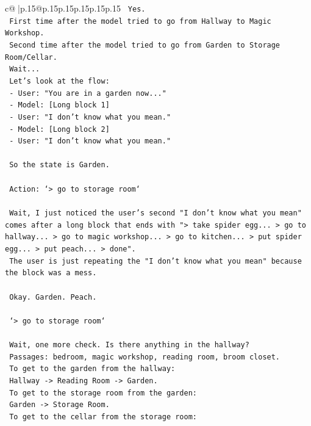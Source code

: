 \documentclass{article}
\begin{document}
{\begin{supertabular}{c@{$\;$}|p{.15\linewidth}@{}p{.15\linewidth}p{.15\linewidth}p{.15\linewidth}p{.15\linewidth}p{.15\linewidth}}
{{{\texttt{    Yes.} \\
\texttt{    First time after the model tried to go from Hallway to Magic Workshop.} \\
\texttt{    Second time after the model tried to go from Garden to Storage Room/Cellar.} \\
\texttt{    Wait...} \\
\texttt{    Let's look at the flow:} \\
\texttt{    {-} User: "You are in a garden now..."} \\
\texttt{    {-} Model: {[}Long block 1{]}} \\
\texttt{    {-} User: "I don't know what you mean."} \\
\texttt{    {-} Model: {[}Long block 2{]}} \\
\texttt{    {-} User: "I don't know what you mean."} \\
\\ 
\texttt{    So the state is Garden.} \\
\\ 
\texttt{    Action: `> go to storage room`} \\
\\ 
\texttt{    Wait, I just noticed the user's second "I don't know what you mean" comes after a long block that ends with "> take spider egg... > go to hallway... > go to magic workshop... > go to kitchen... > put spider egg... > put peach... > done".} \\
\texttt{    The user is just repeating the "I don't know what you mean" because the block was a mess.} \\
\\ 
\texttt{    Okay. Garden. Peach.} \\
\\ 
\texttt{    `> go to storage room`} \\
\\ 
\texttt{    Wait, one more check. Is there anything in the hallway?} \\
\texttt{    Passages: bedroom, magic workshop, reading room, broom closet.} \\
\texttt{    To get to the garden from the hallway:} \\
\texttt{    Hallway {-}> Reading Room {-}> Garden.} \\
\texttt{    To get to the storage room from the garden:} \\
\texttt{    Garden {-}> Storage Room.} \\
\texttt{    To get to the cellar from the storage room:} \\
}}}
\end{supertabular}}
\end{document}
